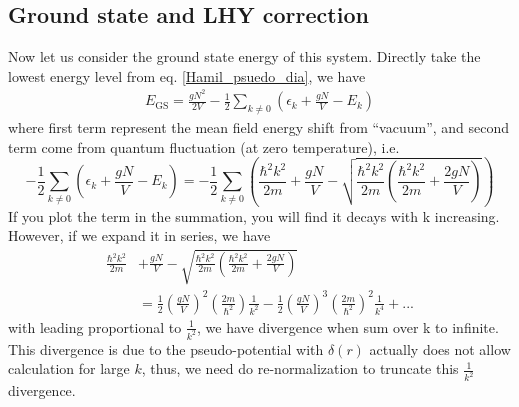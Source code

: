 \subsection{Ground state and LHY correction}
Now let us consider the ground state energy of this system. Directly take the lowest energy level from eq. \ref{Hamil_psuedo_dia}, we have
\begin{equation}
\begin{split}
E_{\text{GS}}=\frac{g N^2}{2V}-\frac{1}{2}\sum _{k\neq 0} \left(\epsilon _k+\frac{g N}{V}-E_k\right)
\end{split}
\end{equation}
where first term represent the mean field energy shift from {``}vacuum{''}, and second term come from quantum fluctuation (at zero temperature), i.e.
\begin{equation}
-\frac{1}{2}\sum _{k\neq 0} \left(\epsilon _k+\frac{g N}{V}-E_k\right)=-\frac{1}{2}\sum _{k\neq 0} \left(\frac{\hbar ^2k^2}{2m}+\frac{g N}{V}-\sqrt{\frac{\hbar
^2k^2}{2m}\left(\frac{\hbar ^2k^2}{2m}+\frac{2 g N}{V}\right)}\right)
\end{equation}
If you plot the term in the summation, you will find it decays with k increasing. However, if we expand it in series, we have 
\begin{equation}
\begin{split}
\frac{\hbar ^2k^2}{2m}&+\frac{g N}{V}-\sqrt{\frac{\hbar ^2k^2}{2m}\left(\frac{\hbar ^2k^2}{2m}+\frac{2 g N}{V}\right)}\\
&=\frac{1}{2}\left(\frac{gN}{V}\right)^2\left(\frac{2m}{\hbar^2}\right)\frac{1}{k^2}-\frac{1}{2}\left(\frac{gN}{V}\right)^3\left(\frac{2m}{\hbar^2}\right)^2\frac{1}{k^4}+\text{...}
\end{split}
\end{equation}
with leading proportional to $\frac{1}{k^2}$, we have divergence when sum over k to infinite. This divergence is due to the pseudo-potential with $\delta (r)$ actually does not allow calculation for large $k$, thus, we need do re-normalization to truncate this $\frac{1}{k^2}$ divergence.

